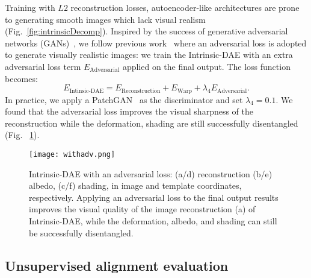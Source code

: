 \documentclass[runningheads]{llncs}
\begin{document}
Training with $L2$ reconstruction losses, autoencoder-like architectures are prone to generating smooth images which lack visual realism (Fig.~\ref{fig:intrinsicDecomp}). Inspired by the success of generative adversarial networks (GANs)~\cite{goodfellow2014generative}, we follow previous work~\cite{ShuYHSSS17} where an adversarial loss is adopted to generate visually realistic images: we train the Intrinsic-DAE with an extra adversarial loss term $E_{\text{Adversarial}}$ applied on the final output. The loss function becomes:
\begin{equation}
    E_{\text{Intinsic-DAE}} = E_{\text{Reconstruction}} + E_{\text{Warp}} + \lambda_4 E_{\text{Adversarial}}.\textbf{}
\end{equation}
In practice, we apply a PatchGAN~\cite{li2016precomputed,pix2pix2016} as the discriminator and set $\lambda_4 = 0.1$. We found that the adversarial loss improves the visual sharpness of the reconstruction while the deformation, shading are still successfully disentangled (Fig. ~\ref{fig:GAN}).


\begin{figure}[!h]
    \centering
    \texttt{[image: withadv.png]}
    \caption{Intrinsic-DAE with an adversarial loss: (a/d) reconstruction (b/e) albedo, (c/f) shading, in image and template coordinates, respectively. 
    Applying an adversarial loss to the final output results improves the visual quality of the image reconstruction (a) of Intrinsic-DAE, while the deformation, albedo, and shading can still be successfully disentangled.}
    \label{fig:GAN}
\end{figure}

\subsection{Unsupervised alignment evaluation}
\end{document}

